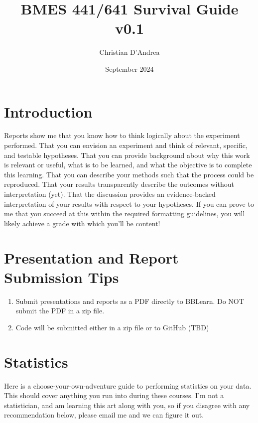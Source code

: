 \documentclass{article}
\title{BMES 441/641 Survival Guide v0.1}
\author{Christian D'Andrea }
\date{September 2024}
\begin{document}
\maketitle

\section{Introduction}
Reports show me that you know how to think logically about the experiment performed. That you can envision an experiment and think of relevant, specific, and testable hypotheses. That you can provide background about why this work is relevant or useful, what is to be learned, and what the objective is to complete this learning. That you can describe your methods such that the process could be reproduced. That your results transparently describe the outcomes without interpretation (yet). That the discussion provides an evidence-backed interpretation of your results with respect to your hypotheses. If you can prove to me that you succeed at this within the required formatting guidelines, you will likely achieve a grade with which you'll be content!

\section{Presentation and Report Submission Tips}
\begin{enumerate}
\item Submit presentations and reports as a PDF directly to BBLearn. Do NOT submit the PDF in a zip file.
\item Code will be submitted either in a zip file or to GitHub (TBD)
\end{enumerate}

\section{Statistics}
Here is a choose-your-own-adventure guide to performing statistics on your data. This should cover anything you run into during these courses. I'm not a statistician, and am learning this art along with you, so if you disagree with any recommendation below, please email me and we can figure it out.
\end{document}
